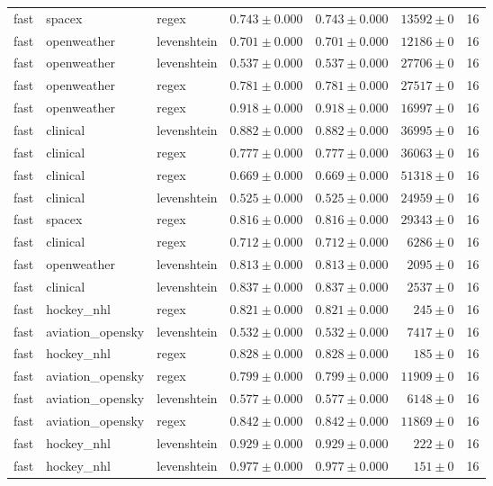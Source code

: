 \begin{table}[htbp]
\begin{tabular}{l l l r r r r}
fast & spacex & regex & $0.743\pm0.000$ & $0.743\pm0.000$ & $13592\pm0$ & 16 \\
fast & openweather & levenshtein & $0.701\pm0.000$ & $0.701\pm0.000$ & $12186\pm0$ & 16 \\
fast & openweather & levenshtein & $0.537\pm0.000$ & $0.537\pm0.000$ & $27706\pm0$ & 16 \\
fast & openweather & regex & $0.781\pm0.000$ & $0.781\pm0.000$ & $27517\pm0$ & 16 \\
fast & openweather & regex & $0.918\pm0.000$ & $0.918\pm0.000$ & $16997\pm0$ & 16 \\
fast & clinical & levenshtein & $0.882\pm0.000$ & $0.882\pm0.000$ & $36995\pm0$ & 16 \\
fast & clinical & regex & $0.777\pm0.000$ & $0.777\pm0.000$ & $36063\pm0$ & 16 \\
fast & clinical & regex & $0.669\pm0.000$ & $0.669\pm0.000$ & $51318\pm0$ & 16 \\
fast & clinical & levenshtein & $0.525\pm0.000$ & $0.525\pm0.000$ & $24959\pm0$ & 16 \\
fast & spacex & regex & $0.816\pm0.000$ & $0.816\pm0.000$ & $29343\pm0$ & 16 \\
fast & clinical & regex & $0.712\pm0.000$ & $0.712\pm0.000$ & $6286\pm0$ & 16 \\
fast & openweather & levenshtein & $0.813\pm0.000$ & $0.813\pm0.000$ & $2095\pm0$ & 16 \\
fast & clinical & levenshtein & $0.837\pm0.000$ & $0.837\pm0.000$ & $2537\pm0$ & 16 \\
fast & hockey\_nhl & regex & $0.821\pm0.000$ & $0.821\pm0.000$ & $245\pm0$ & 16 \\
fast & aviation\_opensky & levenshtein & $0.532\pm0.000$ & $0.532\pm0.000$ & $7417\pm0$ & 16 \\
fast & hockey\_nhl & regex & $0.828\pm0.000$ & $0.828\pm0.000$ & $185\pm0$ & 16 \\
fast & aviation\_opensky & regex & $0.799\pm0.000$ & $0.799\pm0.000$ & $11909\pm0$ & 16 \\
fast & aviation\_opensky & levenshtein & $0.577\pm0.000$ & $0.577\pm0.000$ & $6148\pm0$ & 16 \\
fast & aviation\_opensky & regex & $0.842\pm0.000$ & $0.842\pm0.000$ & $11869\pm0$ & 16 \\
fast & hockey\_nhl & levenshtein & $0.929\pm0.000$ & $0.929\pm0.000$ & $222\pm0$ & 16 \\
fast & hockey\_nhl & levenshtein & $0.977\pm0.000$ & $0.977\pm0.000$ & $151\pm0$ & 16 \\

\end{tabular}
\end{table}
